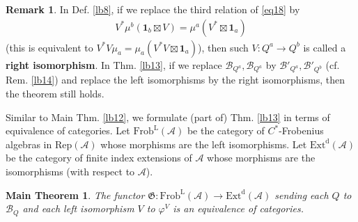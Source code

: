 \documentclass[11pt,b5paper,notitlepage]{article}
\theoremstyle{definition}
\newtheorem{rem}[df]{Remark}
\theoremstyle{plain}
\newtheorem{Mthm}{Main Theorem}
\newcommand{\fk}{\mathfrak}
\newcommand{\mc}{\mathcal}
\newcommand{\id}{\mathbf{1}}
\newcommand{\RepA}{\mathrm{Rep}(\mathcal A)}
\numberwithin{equation}{section}
\begin{document}
\begin{rem}
In Def. \ref{lb8}, if we replace the third relation of \eqref{eq18} by
\begin{align}
V^*\mu^b(\id_b\boxtimes V)=\mu^a(V^*\boxtimes\id_a)	
\end{align}
(this is equivalent to $V^*V\mu_a=\mu_a(V^*V\boxtimes\id_a)$), then such $V:Q^a\rightarrow Q^b$ is called a \textbf{right isomorphism}. In Thm. \ref{lb13}, if we replace $\mc B_{Q^a},\mc B_{Q^a}$  by $\mc B'_{Q^a},\mc B'_{Q^b}$   (cf. Rem. \ref{lb14}) and replace the left isomorphisms by the right isomorphisms, then the theorem still holds.
\end{rem}


Similar to Main Thm. \ref{lb12}, we formulate (part of) Thm. \ref{lb13} in terms of equivalence of categories. Let $\mathrm{Frob}^{\mathrm L}(\mc A)$ be the category of $C^*$-Frobenius algebras in $\RepA$ whose morphisms are the left isomorphisms. Let $\mathrm{Ext}^{\mathrm d}(\mc A)$ be the category of finite index extensions of $\mc A$ whose morphisms are the isomorphisms (with respect to $\mc A$).

\begin{Mthm}\label{lb26}
The functor $\fk G:\mathrm{Frob}^{\mathrm L}(\mc A)\rightarrow\mathrm{Ext}^{\mathrm d}(\mc A)$ sending each $Q$ to $\mc B_Q$ and each left isomorphism $V$ to $\varphi^V$ is an equivalence of categories.
\end{Mthm}
\end{document}
